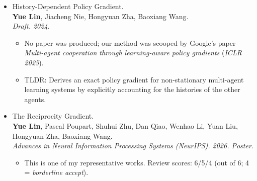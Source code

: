 \documentclass[a4paper,20pt]{article}
\begin{document}
\begin{itemize}[leftmargin=*,itemsep=0pt,topsep=0pt,partopsep=0pt]
      \textbf{Yue Lin}, Shuhui Zhu, Wenhao Li, Ang Li, Dan Qiao, Pascal Poupart, Hongyuan Zha, Baoxiang Wang. \\
      \textit{arXiv preprint. 2025-12-24.}
      \begin{itemize}[itemsep=0pt,topsep=0pt,partopsep=0pt]
        \item This work was scooped by
              \textit{Evaluating LLMs in Open-Source Games}.
              We then planned a substantially improved version, but that follow-up direction was also
              scooped by Google DeepMind's
              \textit{Code-Space Response Oracles: Generating Interpretable Multi-Agent Policies with Large Language Models}.
        \item Sources:
            \href{https://arxiv.org/abs/2512.21024}{[Manuscript]}.
        \item TLDR: Represents each agent's strategy as readable source code and introduces Programmatic Iterated Best Response, where an LLM rewrites one policy against another using game rewards and unit tests as feedback.
      \end{itemize}
\item History-Dependent Policy Gradient. \\
      \textbf{Yue Lin}, Jiacheng Nie, Hongyuan Zha, Baoxiang Wang. \\
      \textit{Draft. 2024.}
      \begin{itemize}[itemsep=0pt,topsep=0pt,partopsep=0pt]
        \item No paper was produced; our method was scooped by Google's paper
              \textit{Multi-agent cooperation through learning-aware policy gradients}
              (\textit{ICLR 2025}).
        \item TLDR: Derives an exact policy gradient for non-stationary multi-agent learning systems by explicitly accounting for the histories of the other agents.
      \end{itemize}
\item The Reciprocity Gradient. \\
      \textbf{Yue Lin}, Pascal Poupart, Shuhui Zhu, Dan Qiao, Wenhao Li, Yuan Liu, Hongyuan Zha, Baoxiang Wang. \\
      \textit{Advances in Neural Information Processing Systems (NeurIPS). 2026. Poster.}
      \begin{itemize}[itemsep=0pt,topsep=0pt,partopsep=0pt]
        \item This is one of my representative works. Review scores: 6/5/4 (out of 6; 4 = \textit{borderline accept}).

\end{itemize}
\end{itemize}
\end{document}
